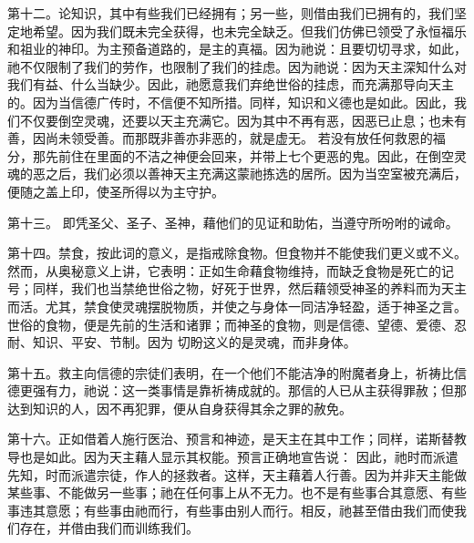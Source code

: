 第十二。论知识，其中有些我们已经拥有；另一些，则借由我们已拥有的，我们坚定地希望。因为我们既未完全获得，也未完全缺乏。但我们仿佛已领受了永恒福乐和祖业的神印。为主预备道路的，是主的真福。因为祂说：且要切切寻求，如此，祂不仅限制了我们的劳作，也限制了我们的挂虑。因为祂说：因为天主深知什么对我们有益、什么当缺少。因此，祂愿意我们弃绝世俗的挂虑，而充满那导向天主的。因为当信德广传时，不信便不知所措。同样，知识和义德也是如此。因此，我们不仅要倒空灵魂，还要以天主充满它。因为其中不再有恶，因恶已止息；也未有善，因尚未领受善。而那既非善亦非恶的，就是虚无。  若没有放任何救恩的福分，那先前住在里面的不洁之神便会回来，并带上七个更恶的鬼。因此，在倒空灵魂的恶之后，我们必须以善神天主充满这蒙祂拣选的居所。因为当空室被充满后，便随之盖上印，使圣所得以为主守护。\par

第十三。  即凭圣父、圣子、圣神，藉他们的见证和助佑，当遵守所吩咐的诫命。\par

第十四。禁食，按此词的意义，是指戒除食物。但食物并不能使我们更义或不义。然而，从奥秘意义上讲，它表明：正如生命藉食物维持，而缺乏食物是死亡的记号；同样，我们也当禁绝世俗之物，好死于世界，然后藉领受神圣的养料而为天主而活。尤其，禁食使灵魂摆脱物质，并使之与身体一同洁净轻盈，适于神圣之言。世俗的食物，便是先前的生活和诸罪；而神圣的食物，则是信德、望德、爱德、忍耐、知识、平安、节制。因为  切盼这义的是灵魂，而非身体。\par

第十五。救主向信德的宗徒们表明，在一个他们不能洁净的附魔者身上，祈祷比信德更强有力，祂说：这一类事情是靠祈祷成就的。那信的人已从主获得罪赦；但那达到知识的人，因不再犯罪，便从自身获得其余之罪的赦免。\par

第十六。正如借着人施行医治、预言和神迹，是天主在其中工作；同样，诺斯替教导也是如此。因为天主藉人显示其权能。预言正确地宣告说：  因此，祂时而派遣先知，时而派遣宗徒，作人的拯救者。这样，天主藉着人行善。因为并非天主能做某些事、不能做另一些事；祂在任何事上从不无力。也不是有些事合其意愿、有些事违其意愿；有些事由祂而行，有些事由别人而行。相反，祂甚至借由我们而使我们存在，并借由我们而训练我们。\par

